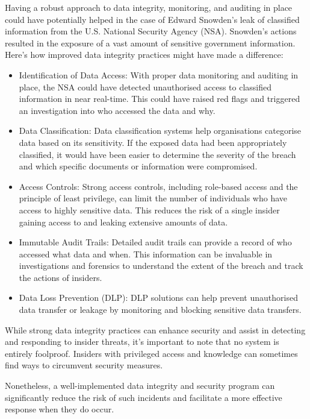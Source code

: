 \documentclass{tufte-handout}
\begin{document}
Having a robust approach to data integrity, monitoring, and auditing in place could have potentially helped in the case of Edward Snowden's leak of classified information from the U.S. National Security
Agency (NSA). Snowden's actions resulted in the exposure of a vast amount of sensitive government information. Here's how improved data integrity practices might have made a difference:
\begin{itemize}
\item Identification of Data Access: With proper data monitoring and auditing in place, the NSA could have detected unauthorised access to classified information in near real-time. This could have raised red flags and triggered an investigation into who accessed the data and why.
\item Data Classification: Data classification systems help organisations categorise data based on its sensitivity. If the exposed data had been appropriately classified, it would have been easier to determine the severity of the breach and which specific documents or information were compromised.
\item Access Controls: Strong access controls, including role-based access and the principle of least privilege, can limit the number of individuals who have access to highly sensitive data. This reduces the risk of a single insider gaining access to and leaking extensive amounts of data.
\item Immutable Audit Trails: Detailed audit trails can provide a record of who accessed what data and when. This information can be invaluable in investigations and forensics to understand the extent of the breach and track the actions of insiders.
\item Data Loss Prevention (DLP): DLP solutions can help prevent unauthorised data transfer or leakage by monitoring and blocking sensitive data transfers.
\end{itemize}

While strong data integrity practices can enhance security and assist in detecting and responding to insider threats, it's important to note that no system is entirely foolproof.
Insiders with privileged access and knowledge can sometimes find ways to circumvent security measures.

Nonetheless, a well-implemented data integrity and security program can significantly reduce the risk of such incidents and facilitate a more effective response when they do occur.


\end{document}
